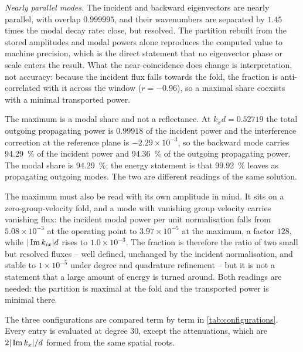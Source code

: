\emph{Nearly parallel modes.}  The incident and backward eigenvectors
are nearly parallel, with overlap $0.999995$, and their wavenumbers are
separated by $1.45$ times the modal decay rate: close, but resolved.  The
partition rebuilt from the stored amplitudes and modal powers alone reproduces the computed value to machine precision, which is the direct statement that no
eigenvector phase or scale enters the result.  What the near-coincidence does
change is interpretation, not accuracy: because the incident flux falls towards
the fold, the fraction is anti-correlated with it across the window
($r=-0.96$), so a maximal share coexists with a minimal transported power.

The maximum is a modal share and not a reflectance.  At $k_xd=0.52719$ the
total outgoing propagating power is $0.99918$ of the incident power and the
interference correction at the reference plane is $-2.29\times10^{-3}$, so the
backward mode carries \SI{94.29}{\percent} of the incident power and
\SI{94.36}{\percent} of the outgoing propagating power.  The modal share is
\SI{94.29}{\percent}; the energy statement is that \SI{99.92}{\percent} leaves
as propagating outgoing modes.  The two are different readings of the same
solution.

The maximum must also be read with its own amplitude in mind.  It sits on a
zero-group-velocity fold, and a mode with vanishing group velocity carries
vanishing flux: the incident modal power per unit normalisation falls from
$5.08\times10^{-3}$ at the operating point to $3.97\times10^{-5}$ at the
maximum, a factor $128$, while $|\operatorname{Im} k_{ix}|d$ rises to $1.0\times10^{-3}$.
The fraction is therefore the ratio of two small but resolved fluxes -- well
defined, unchanged by the incident normalisation, and stable to
$1\times10^{-5}$ under degree and quadrature refinement -- but it is not a statement that a
large amount of energy is turned around.  Both readings are needed: the
partition is maximal at the fold and the transported power is minimal there.

The three configurations are compared term by term in
\cref{tab:configurations}.  Every entry is evaluated at degree 30, except the
attenuations, which are $2|\operatorname{Im} k_x|/d$ formed from the same spatial roots.

